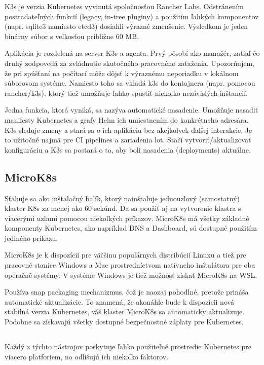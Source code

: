 K3s je verzia Kubernetes vyvinutá spoločnosťou Rancher Labs. Odstránením postradateľných funkcií (legacy, in-tree pluginy) a použitím ľahkých komponentov (napr. sqlite3 namiesto etcd3) dosiahli výrazné zmenšenie. Výsledkom je jeden binárny súbor s veľkosťou približne 60 MB.

Aplikácia je rozdelená na server K3s a agenta. Prvý pôsobí ako manažér, zatiaľ čo druhý zodpovedá za zvládnutie skutočného pracovného zaťaženia. Upozorňujem, že pri spúšťaní na počítací môže dôjsť k výraznému neporiadku v lokálnom súborovom systéme. Namiesto toho sa vkladá k3s do kontajnera (napr. pomocou rancher/k3s), ktorý tiež umožňuje ľahko spustiť niekoľko nezávislých inštancií.

Jedna funkcia, ktorá vyniká, sa nazýva automatické nasadenie. Umožňuje nasadiť manifesty Kubernetes a grafy Helm ich umiestnením do konkrétneho adresára. K3s sleduje zmeny a stará sa o ich aplikáciu bez akejkoľvek ďalšej interakcie. Je to užitočné najmä pre CI pipelines a zariadenia lot. Stačí vytvoriť/aktualizovať konfiguráciu a K3s sa postará o to, aby boli nasadenia (deployments) aktuálne.

\subsection*{MicroK8s}
Sťahuje sa ako inštalačný balík, ktorý nainštaluje jednouzlový (samostatný) klaster K8s za menej ako 60 sekúnd. Da sa použiť aj na vytvorenie klastra s viacerými uzlami pomocou niekoľkých príkazov. MicroK8s má všetky základné komponenty Kubernetes, ako napríklad DNS a Dashboard, sú dostupné použitím jediného príkazu.

MicroK8s je k dispozícii pre väčšinu populárnych distribúcií Linuxu a tiež pre pracovné stanice Windows a Mac prostredníctvom natívneho inštalátora pre oba operačné systémy. V systéme Windows je tiež možnosť získať MicroK8s na WSL.

Používa snap packaging mechanizmus, čož je naozaj pohodlné, pretože prináša automatické aktualizácie. To znamená, že akonáhle bude k dispozícii nová stabilná verzia Kubernetes, váš klaster MicroK8s sa automaticky aktualizuje. Podobne sa získavajú všetky dostupné bezpečnostné záplaty pre Kubernetes.\cite{comparetool}

\subsection*{}

Každý z týchto nástrojov poskytuje ľahko použiteľné prostredie Kubernetes pre viacero platforiem, no odlišujú ich niekoľko faktorov.

